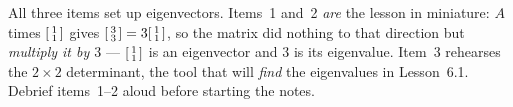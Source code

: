\documentclass[10pt]{article}
\begin{document}
\begin{teachernote}
All three items set up eigenvectors. Items~1 and~2 \emph{are} the lesson in miniature: $A$ times
$\begin{bsmallmatrix}1\\1\end{bsmallmatrix}$ gives $\begin{bsmallmatrix}3\\3\end{bsmallmatrix}=
3\begin{bsmallmatrix}1\\1\end{bsmallmatrix}$, so the matrix did nothing to that direction but
\emph{multiply it by $3$} --- $\begin{bsmallmatrix}1\\1\end{bsmallmatrix}$ is an eigenvector and $3$
is its eigenvalue. Item~3 rehearses the $2\times2$ determinant, the tool that will \emph{find} the
eigenvalues in Lesson~6.1. Debrief items~1--2 aloud before starting the notes.
\end{teachernote}
\end{document}
